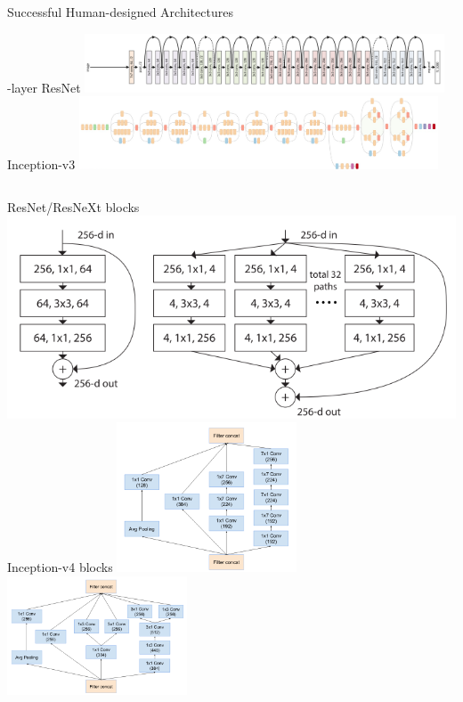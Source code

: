 \begin{frame}[c]{Successful Human-designed Architectures}

-layer ResNet 
\includegraphics[width=0.8\textwidth]{images_lec7/resnet.png}\\
Inception-v3 
\includegraphics[width=0.8\textwidth]{images_lec7/inception.png}
\pause

\begin{columns}

ResNet/ResNeXt blocks 
\includegraphics[width=\textwidth]{images_lec7/resnet_block.png}
Inception-v4 blocks 
\includegraphics[width=0.4\textwidth]{images_lec7/inception_1.png}
\includegraphics[width=0.4\textwidth]{images_lec7/inception_2.png}

\end{columns}

\end{frame}
